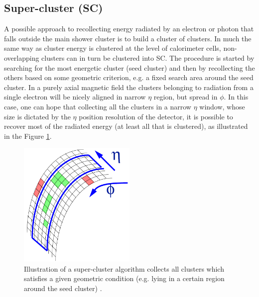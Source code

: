 \subsection{Super-cluster (SC)}\label{subsec:super-cluster}

A possible approach to recollecting energy radiated by an electron or photon that falls outside the main shower cluster is to build a cluster of clusters. In much the same way as cluster energy is clustered at the level of calorimeter cells, non-overlapping clusters can in turn be clustered into SC. The procedure is started by searching for the most energetic cluster (seed cluster) and then by recollecting the others based on some geometric criterion, e.g. a fixed search area around the seed cluster. In a purely axial magnetic field the clusters belonging to radiation from a single electron will be nicely aligned in narrow $\eta$ region, but spread in $\phi$. In this case, one can hope that collecting all the clusters in a narrow $\eta$ window, whose size is dictated by the $\eta$ position resolution of the detector, it is possible to recover most of the radiated energy (at least all that is clustered), as illustrated in the Figure \ref{fig:Super-cluster}.

\begin{figure}[h!]
\begin{center}
\includegraphics[width=0.5\textwidth]{figures/Reconstruction/Electron_photon/SuperCluster.png}
\caption{Illustration of a super-cluster algorithm collects all clusters which satisfies a given geometric condition (e.g. lying in a certain region around the seed cluster) \cite{CMS-Note-2001-034}.}
\label{fig:Super-cluster}
\end{center}
\end{figure}


